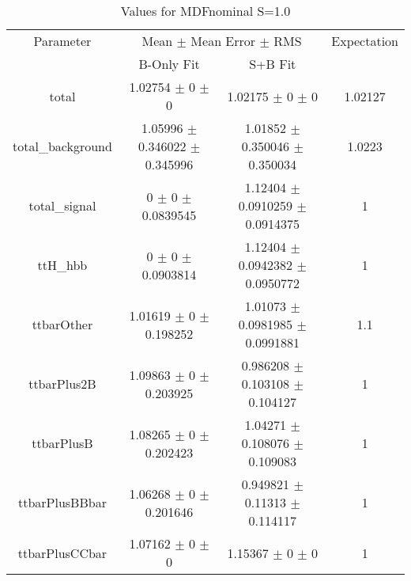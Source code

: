 \begin{table}
\centering
\caption{Values for MDFnominal S=1.0}
\begin{tabular}{cccc}
\toprule
Parameter & \multicolumn{2}{c}{Mean $\pm$ Mean Error $\pm$ RMS} & Expectation\\
 & B-Only Fit & S+B Fit & \\
\midrule
total & \num{1.02754} $\pm$ \num{0} $\pm$ \num{0} & \num{1.02175} $\pm$ \num{0} $\pm$ \num{0} & \num{1.02127}\\
total\_background & \num{1.05996} $\pm$ \num{0.346022} $\pm$ \num{0.345996} & \num{1.01852} $\pm$ \num{0.350046} $\pm$ \num{0.350034} & \num{1.0223}\\
total\_signal & \num{0} $\pm$ \num{0} $\pm$ \num{0.0839545} & \num{1.12404} $\pm$ \num{0.0910259} $\pm$ \num{0.0914375} & \num{1}\\
ttH\_hbb & \num{0} $\pm$ \num{0} $\pm$ \num{0.0903814} & \num{1.12404} $\pm$ \num{0.0942382} $\pm$ \num{0.0950772} & \num{1}\\
ttbarOther & \num{1.01619} $\pm$ \num{0} $\pm$ \num{0.198252} & \num{1.01073} $\pm$ \num{0.0981985} $\pm$ \num{0.0991881} & \num{1.1}\\
ttbarPlus2B & \num{1.09863} $\pm$ \num{0} $\pm$ \num{0.203925} & \num{0.986208} $\pm$ \num{0.103108} $\pm$ \num{0.104127} & \num{1}\\
ttbarPlusB & \num{1.08265} $\pm$ \num{0} $\pm$ \num{0.202423} & \num{1.04271} $\pm$ \num{0.108076} $\pm$ \num{0.109083} & \num{1}\\
ttbarPlusBBbar & \num{1.06268} $\pm$ \num{0} $\pm$ \num{0.201646} & \num{0.949821} $\pm$ \num{0.11313} $\pm$ \num{0.114117} & \num{1}\\
ttbarPlusCCbar & \num{1.07162} $\pm$ \num{0} $\pm$ \num{0} & \num{1.15367} $\pm$ \num{0} $\pm$ \num{0} & \num{1}\\
\bottomrule
\end{tabular}
\end{table}